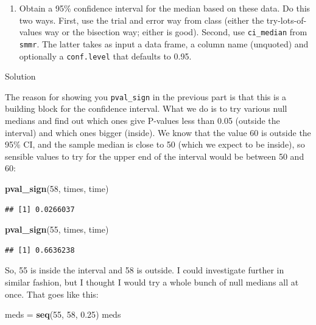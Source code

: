 \documentclass[]{tufte-book}
\newenvironment{Shaded}{}{}
\newcommand{\DecValTok}[1]{\textcolor[rgb]{0.25,0.63,0.44}{#1}}
\newcommand{\FloatTok}[1]{\textcolor[rgb]{0.25,0.63,0.44}{#1}}
\newcommand{\KeywordTok}[1]{\textcolor[rgb]{0.00,0.44,0.13}{\textbf{#1}}}
\newcommand{\NormalTok}[1]{#1}
\newcommand{\StringTok}[1]{\textcolor[rgb]{0.25,0.44,0.63}{#1}}
\providecommand{\tightlist}{%
  \setlength{\itemsep}{0pt}\setlength{\parskip}{0pt}}
\theoremstyle{definition}
\theoremstyle{definition}
\theoremstyle{definition}
\theoremstyle{remark}
\begin{document}
\begin{enumerate}
\def\labelenumi{(\alph{enumi})}
\setcounter{enumi}{4}
\tightlist
\item
  Obtain a 95\% confidence interval for the median based on these data.
  Do this two ways. First, use the trial and error way from class
  (either the try-lots-of-values way or the bisection way; either is
  good). Second, use \texttt{ci\_median} from \texttt{smmr}. The latter
  takes as input a data frame, a column name (unquoted) and optionally a
  \texttt{conf.level} that defaults to 0.95.
\end{enumerate}

Solution

The reason for showing you \texttt{pval\_sign} in the previous part is
that this is a building block for the confidence interval. What we do is
to try various null medians and find out which ones give P-values less
than 0.05 (outside the interval) and which ones bigger (inside). We know
that the value 60 is outside the 95\% CI, and the sample median is close
to 50 (which we expect to be inside), so sensible values to try for the
upper end of the interval would be between 50 and 60:

\begin{Shaded}
\begin{Highlighting}[]
\KeywordTok{pval_sign}\NormalTok{(}\DecValTok{58}\NormalTok{, times, time)}
\end{Highlighting}
\end{Shaded}

\begin{verbatim}
## [1] 0.0266037
\end{verbatim}

\begin{Shaded}
\begin{Highlighting}[]
\KeywordTok{pval_sign}\NormalTok{(}\DecValTok{55}\NormalTok{, times, time)}
\end{Highlighting}
\end{Shaded}

\begin{verbatim}
## [1] 0.6636238
\end{verbatim}

So, 55 is inside the interval and 58 is outside. I could investigate
further in similar fashion, but I thought I would try a whole bunch of
null medians all at once. That goes like this:

\begin{Shaded}
\begin{Highlighting}[]
\NormalTok{meds =}\StringTok{ }\KeywordTok{seq}\NormalTok{(}\DecValTok{55}\NormalTok{, }\DecValTok{58}\NormalTok{, }\FloatTok{0.25}\NormalTok{)}
\NormalTok{meds}
\end{Highlighting}
\end{Shaded}
\end{document}
